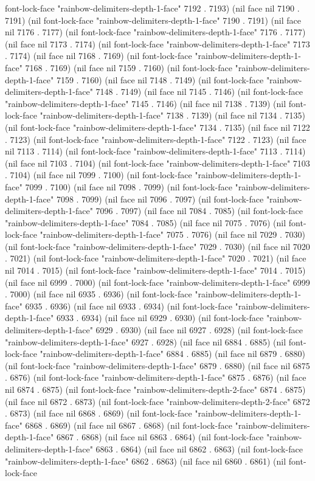 font-lock-face "rainbow-delimiters-depth-1-face" 7192 . 7193) (nil face nil 7190 . 7191) (nil font-lock-face "rainbow-delimiters-depth-1-face" 7190 . 7191) (nil face nil 7176 . 7177) (nil font-lock-face "rainbow-delimiters-depth-1-face" 7176 . 7177) (nil face nil 7173 . 7174) (nil font-lock-face "rainbow-delimiters-depth-1-face" 7173 . 7174) (nil face nil 7168 . 7169) (nil font-lock-face "rainbow-delimiters-depth-1-face" 7168 . 7169) (nil face nil 7159 . 7160) (nil font-lock-face "rainbow-delimiters-depth-1-face" 7159 . 7160) (nil face nil 7148 . 7149) (nil font-lock-face "rainbow-delimiters-depth-1-face" 7148 . 7149) (nil face nil 7145 . 7146) (nil font-lock-face "rainbow-delimiters-depth-1-face" 7145 . 7146) (nil face nil 7138 . 7139) (nil font-lock-face "rainbow-delimiters-depth-1-face" 7138 . 7139) (nil face nil 7134 . 7135) (nil font-lock-face "rainbow-delimiters-depth-1-face" 7134 . 7135) (nil face nil 7122 . 7123) (nil font-lock-face "rainbow-delimiters-depth-1-face" 7122 . 7123) (nil face nil 7113 . 7114) (nil font-lock-face "rainbow-delimiters-depth-1-face" 7113 . 7114) (nil face nil 7103 . 7104) (nil font-lock-face "rainbow-delimiters-depth-1-face" 7103 . 7104) (nil face nil 7099 . 7100) (nil font-lock-face "rainbow-delimiters-depth-1-face" 7099 . 7100) (nil face nil 7098 . 7099) (nil font-lock-face "rainbow-delimiters-depth-1-face" 7098 . 7099) (nil face nil 7096 . 7097) (nil font-lock-face "rainbow-delimiters-depth-1-face" 7096 . 7097) (nil face nil 7084 . 7085) (nil font-lock-face "rainbow-delimiters-depth-1-face" 7084 . 7085) (nil face nil 7075 . 7076) (nil font-lock-face "rainbow-delimiters-depth-1-face" 7075 . 7076) (nil face nil 7029 . 7030) (nil font-lock-face "rainbow-delimiters-depth-1-face" 7029 . 7030) (nil face nil 7020 . 7021) (nil font-lock-face "rainbow-delimiters-depth-1-face" 7020 . 7021) (nil face nil 7014 . 7015) (nil font-lock-face "rainbow-delimiters-depth-1-face" 7014 . 7015) (nil face nil 6999 . 7000) (nil font-lock-face "rainbow-delimiters-depth-1-face" 6999 . 7000) (nil face nil 6935 . 6936) (nil font-lock-face "rainbow-delimiters-depth-1-face" 6935 . 6936) (nil face nil 6933 . 6934) (nil font-lock-face "rainbow-delimiters-depth-1-face" 6933 . 6934) (nil face nil 6929 . 6930) (nil font-lock-face "rainbow-delimiters-depth-1-face" 6929 . 6930) (nil face nil 6927 . 6928) (nil font-lock-face "rainbow-delimiters-depth-1-face" 6927 . 6928) (nil face nil 6884 . 6885) (nil font-lock-face "rainbow-delimiters-depth-1-face" 6884 . 6885) (nil face nil 6879 . 6880) (nil font-lock-face "rainbow-delimiters-depth-1-face" 6879 . 6880) (nil face nil 6875 . 6876) (nil font-lock-face "rainbow-delimiters-depth-1-face" 6875 . 6876) (nil face nil 6874 . 6875) (nil font-lock-face "rainbow-delimiters-depth-2-face" 6874 . 6875) (nil face nil 6872 . 6873) (nil font-lock-face "rainbow-delimiters-depth-2-face" 6872 . 6873) (nil face nil 6868 . 6869) (nil font-lock-face "rainbow-delimiters-depth-1-face" 6868 . 6869) (nil face nil 6867 . 6868) (nil font-lock-face "rainbow-delimiters-depth-1-face" 6867 . 6868) (nil face nil 6863 . 6864) (nil font-lock-face "rainbow-delimiters-depth-1-face" 6863 . 6864) (nil face nil 6862 . 6863) (nil font-lock-face "rainbow-delimiters-depth-1-face" 6862 . 6863) (nil face nil 6860 . 6861) (nil font-lock-face 